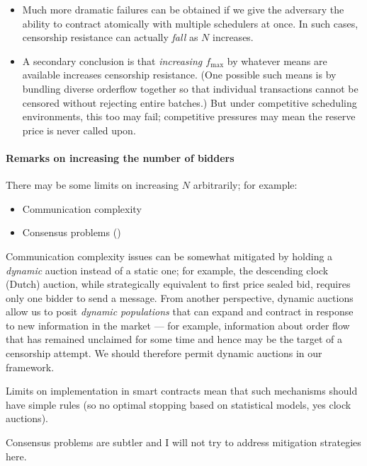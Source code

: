 \begin{itemize}
  \item
    Much more dramatic failures can be obtained if we give the adversary the ability to contract atomically with multiple schedulers at once.
    In such cases, censorship resistance can actually \emph{fall} as $N$ increases.

  \item
    A secondary conclusion is that \emph{increasing $f_\mathrm{max}$} by whatever means are available increases censorship resistance.
    (One possible such means is by bundling diverse orderflow together so that individual transactions cannot be censored without rejecting entire batches.)
    But under competitive scheduling environments, this too may fail; competitive pressures may mean the reserve price is never called upon.

\end{itemize}


\paragraph{Remarks on increasing the number of bidders}

There may be some limits on increasing $N$ arbitrarily; for example:
\begin{itemize}
  \item Communication complexity
  \item Consensus problems (\cite{filecoin})
\end{itemize}
Communication complexity issues can be somewhat mitigated by holding a \emph{dynamic} auction instead of a static one; for example, the descending clock (Dutch) auction, while strategically equivalent to first price sealed bid, requires only one bidder to send a message.
%
From another perspective, dynamic auctions allow us to posit \emph{dynamic populations} that can expand and contract in response to new information in the market --- for example, information about order flow that has remained unclaimed for some time and hence may be the target of a censorship attempt.
%
We should therefore permit dynamic auctions in our framework.

Limits on implementation in smart contracts mean that such mechanisms should have simple rules (so no optimal stopping based on statistical models, yes clock auctions).

Consensus problems are subtler and I will not try to address mitigation strategies here.

